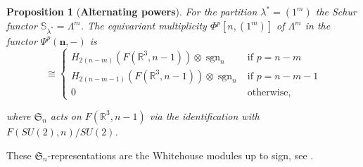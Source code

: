\documentclass[12pt]{article}
\newcommand{\R}{\mathbb{R}}
\newcommand{\SymGroup}[1][n]{\mathfrak{S}_{#1}}
\newcommand{\TransposePartition}[1]{{#1}^{\ast}}
\newcommand{\Schur}[1]{\mathbb{S}_{#1}}
\newcommand{\n}[1][n]{\mathbf{#1}}
\newcommand{\sgn}[1][n]{\operatorname{sgn}_{#1}}
\theoremstyle{plain}
\newtheorem{prop}[thm]{Proposition}
\theoremstyle{definition}
\theoremstyle{remark}
\begin{document}
\begin{prop}[\textbf{Alternating powers}]\label{prop:alternating powers}
    For the partition $\TransposePartition{\lambda} = (1^m)$ the Schur functor $\Schur{\TransposePartition{\lambda}} = \Lambda^m$. The equivariant multiplicity $\Phi^p[n,(1^m)]$ of $\Lambda^m$ in the functor $\Psi^p(\n,-)$ is
\begin{equation}
    \cong
    \begin{cases}
    H_{2(n-m)}(F(\R^3,n-1))\otimes \sgn & \text{if }p=n-m \\
    H_{2(n-m-1)}(F(\R^3,n-1))\otimes \sgn & \text{if }p=n-m-1 \\
    0 & \text{otherwise},
    \end{cases}
\end{equation}

where $\SymGroup$ acts on $F(\R^3,n-1)$ via the identification with $F(SU(2),n)/SU(2)$.
\end{prop}
These $\SymGroup$-representations are the Whitehouse modules up to sign, see \cite{ER19}.
\end{document}

